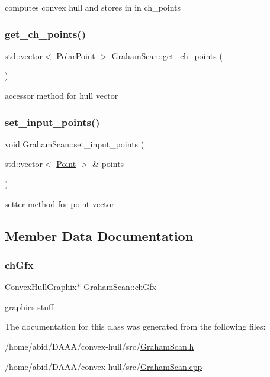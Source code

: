 computes convex hull and stores in in ch\+\_\+points \mbox{\label{class_graham_scan_af42f09a4283ae9821917e13322be4b49}} 
\subsubsection{\texorpdfstring{get\_ch\_points()}{get\_ch\_points()}}
{\footnotesize\ttfamily std\+::vector$<$ \mbox{\hyperlink{class_polar_point}{Polar\+Point}} $>$ Graham\+Scan\+::get\+\_\+ch\+\_\+points (\begin{DoxyParamCaption}{ }\end{DoxyParamCaption})}

accessor method for hull vector \mbox{\label{class_graham_scan_a4e22ff4e4ee0cb57ae30bd06fd39871b}} 
\subsubsection{\texorpdfstring{set\_input\_points()}{set\_input\_points()}}
{\footnotesize\ttfamily void Graham\+Scan\+::set\+\_\+input\+\_\+points (\begin{DoxyParamCaption}\item[{std\+::vector$<$ \mbox{\hyperlink{class_point}{Point}} $>$ \&}]{points }\end{DoxyParamCaption})}

setter method for point vector 

\subsection{Member Data Documentation}
\mbox{\label{class_graham_scan_a3c5dda4a0c904b22a179511cc1d879ce}} 
\subsubsection{\texorpdfstring{chGfx}{chGfx}}
{\footnotesize\ttfamily \mbox{\hyperlink{class_convex_hull_graphix}{Convex\+Hull\+Graphix}}$\ast$ Graham\+Scan\+::ch\+Gfx}

graphics stuff 

The documentation for this class was generated from the following files\+:\begin{DoxyCompactItemize}
\item 
/home/abid/\+D\+A\+A\+A/convex-\/hull/src/\mbox{\hyperlink{_graham_scan_8h}{Graham\+Scan.\+h}}\item 
/home/abid/\+D\+A\+A\+A/convex-\/hull/src/\mbox{\hyperlink{_graham_scan_8cpp}{Graham\+Scan.\+cpp}}\end{DoxyCompactItemize}
